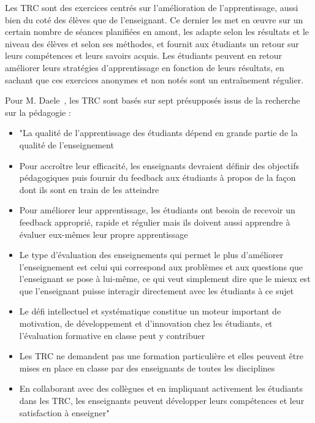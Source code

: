 Les TRC sont des exercices centrés sur l'amélioration de l'apprentissage, aussi bien du coté des élèves que de l'enseignant. Ce dernier les met en œuvre sur un certain nombre de séances planifiées en amont, les adapte selon les résultats et le niveau des élèves et selon ses méthodes, et fournit aux étudiants un retour sur leurs compétences et leurs savoirs acquis. Les étudiants peuvent en retour améliorer leurs stratégies d'apprentissage en fonction de leurs résultats, en sachant que ces exercices anonymes et non notés sont un entraînement régulier. \par

Pour M. Daele~\cite{gamif-CATs}, les TRC sont basés sur sept présupposés issus de la recherche sur la pédagogie : 
\begin{itemize}
    \item "La qualité de l’apprentissage des étudiants dépend en grande partie de la qualité de l’enseignement
    \item Pour accroître leur efficacité, les enseignants devraient définir des objectifs pédagogiques puis fournir du feedback aux étudiants à propos de la façon dont ils sont en train de les atteindre
    \item Pour améliorer leur apprentissage, les étudiants ont besoin de recevoir un feedback approprié, rapide et régulier mais ils doivent aussi apprendre à évaluer eux-mêmes leur propre apprentissage
    \item Le type d’évaluation des enseignements qui permet le plus d’améliorer l’enseignement est celui qui correspond aux problèmes et aux questions que l’enseignant se pose à lui-même, ce qui veut simplement dire que le mieux est que l’enseignant puisse interagir directement avec les étudiants à ce sujet
    \item Le défi intellectuel et systématique constitue un moteur important de motivation, de développement et d’innovation chez les étudiants, et l’évaluation formative en classe peut y contribuer
    \item Les TRC ne demandent pas une formation particulière et elles peuvent être mises en place en classe par des enseignants de toutes les disciplines
    \item En collaborant avec des collègues et en impliquant activement les étudiants dans les TRC, les enseignants peuvent développer leurs compétences et leur satisfaction à enseigner"
\end{itemize}
\par 

